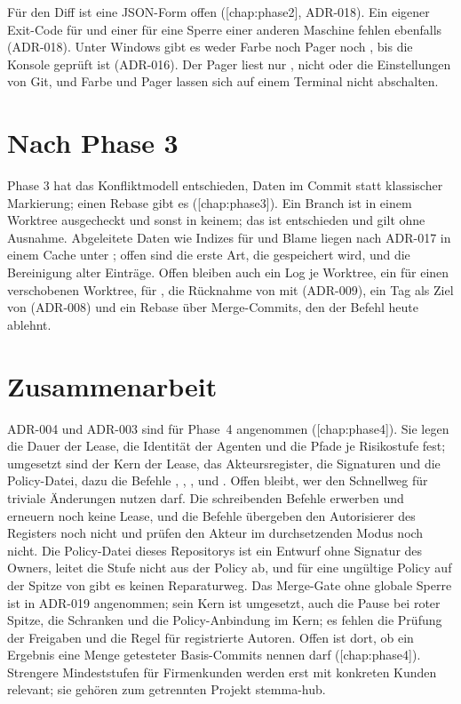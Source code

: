 Für den Diff ist eine JSON-Form offen ([chap:phase2], ADR-018).
Ein eigener Exit-Code für  und einer für eine Sperre einer anderen
Maschine fehlen ebenfalls (ADR-018).
Unter Windows gibt es weder Farbe noch Pager noch , bis die Konsole
geprüft ist (ADR-016). Der Pager liest nur , nicht  oder die
Einstellungen von Git, und Farbe und Pager lassen sich auf einem Terminal nicht abschalten.

\section{Nach Phase 3}

Phase 3 hat das Konfliktmodell entschieden, Daten im Commit statt klassischer Markierung;
einen Rebase gibt es ([chap:phase3]). Ein Branch ist in einem Worktree
ausgecheckt und sonst in keinem; das ist entschieden und gilt ohne Ausnahme.
Abgeleitete Daten wie Indizes für  und Blame liegen nach ADR-017 in einem Cache
unter ; offen sind die erste Art, die gespeichert wird, und die
Bereinigung alter Einträge.
Offen bleiben auch ein Log je Worktree, ein  für einen verschobenen
Worktree,  für , die Rücknahme von  mit
 (ADR-009), ein Tag als Ziel von  (ADR-008)
und ein Rebase über Merge-Commits, den der Befehl heute ablehnt.

\section{Zusammenarbeit}

ADR-004 und ADR-003 sind für Phase~4 angenommen
([chap:phase4]).
Sie legen die Dauer der Lease, die Identität der Agenten und die Pfade je Risikostufe fest;
umgesetzt sind der Kern der Lease, das Akteursregister, die Signaturen und die Policy-Datei,
dazu die Befehle , , ,  und .
Offen bleibt, wer den Schnellweg für triviale Änderungen nutzen darf.
Die schreibenden Befehle erwerben und erneuern noch keine Lease,
und die Befehle übergeben den Autorisierer des Registers noch nicht
und prüfen den Akteur im durchsetzenden Modus noch nicht.
Die Policy-Datei dieses Repositorys ist ein Entwurf ohne Signatur des Owners,
 leitet die Stufe nicht aus der Policy ab, und für eine ungültige Policy auf der
Spitze von  gibt es keinen Reparaturweg.
Das Merge-Gate ohne globale Sperre ist in ADR-019 angenommen; sein Kern ist umgesetzt, auch die
Pause bei roter Spitze, die Schranken und die Policy-Anbindung im Kern; es fehlen die Prüfung der
Freigaben und die Regel für registrierte Autoren.
Offen ist dort, ob ein Ergebnis eine Menge getesteter Basis-Commits nennen darf
([chap:phase4]).
Strengere Mindeststufen für Firmenkunden werden erst mit konkreten Kunden relevant;
sie gehören zum getrennten Projekt stemma-hub.

